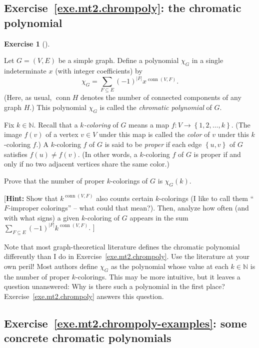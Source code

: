 \documentclass[numbers=enddot,12pt,final,onecolumn,notitlepage]{scrartcl}%
\newcounter{exer}
\theoremstyle{definition}
\newtheorem{exmp}[exer]{Exercise}
\newenvironment{exercise}[1][]
{\begin{exmp}[#1]\begin{leftbar}}
{\end{leftbar}\end{exmp}}
\let\sumnonlimits\sum
\renewcommand{\sum}{\sumnonlimits\limits}
\newcommand{\conn}{\operatorname{conn}}
\newcommand{\NN}{\mathbb{N}}
\newcommand{\set}[1]{\left\{ #1 \right\}}
\newcommand{\abs}[1]{\left| #1 \right|}
\newcommand{\tup}[1]{\left( #1 \right)}
\begin{document}
\subsection{Exercise~\ref{exe.mt2.chrompoly}:
the chromatic polynomial}

\begin{exercise} \label{exe.mt2.chrompoly}
Let $G = \tup{V, E}$ be a simple graph.
Define a polynomial $\chi_G$ in a single indeterminate $x$ (with
integer coefficients) by
\[
\chi_G = \sum_{F \subseteq E} \tup{-1}^{\abs{F}} x^{\conn\tup{V, F}} .
\]
(Here, as usual, $\conn H$ denotes the number of connected components
of any graph $H$.)
This polynomial $\chi_G$ is called the \textit{chromatic polynomial}
of $G$.

Fix $k \in \NN$.
Recall that a \textit{$k$-coloring} of $G$ means a map
$f : V \to \set{1, 2, \ldots, k}$.
(The image $f \tup{v}$ of a vertex $v \in V$ under this map is called
the \textit{color} of $v$ under this $k$-coloring $f$.)
A $k$-coloring $f$ of $G$ is said to be \textit{proper} if
each edge $\set{u, v}$ of $G$ satisfies $f \tup{u} \neq f \tup{v}$.
(In other words, a $k$-coloring $f$ of $G$ is proper if and only if
no two adjacent vertices share the same color.)

Prove that the number of proper $k$-colorings of $G$ is
$\chi_G \tup{k}$.

[\textbf{Hint:} Show that $k^{\conn\tup{V, F}}$ also counts certain
$k$-colorings (I like to call them ``$F$-improper colorings''
-- what could that mean?).
Then, analyze how often (and with what signs) a given $k$-coloring of
$G$ appears in the sum
$\sum_{F \subseteq E} \tup{-1}^{\abs{F}} k^{\conn\tup{V, F}}$. ]
\end{exercise}

Note that most graph-theoretical literature defines the chromatic
polynomial differently than I do in Exercise~\ref{exe.mt2.chrompoly}.
Use the literature at your own peril!
{\small Most authors define $\chi_G$ as the polynomial whose value at
each $k \in \NN$ is the number of proper $k$-colorings.
This may be more intuitive, but it leaves a question unanswered:
Why is there such a polynomial in the first place?
Exercise~\ref{exe.mt2.chrompoly} answers this question.}

\subsection{Exercise~\ref{exe.mt2.chrompoly-examples}:
some concrete chromatic polynomials}
\end{document}
